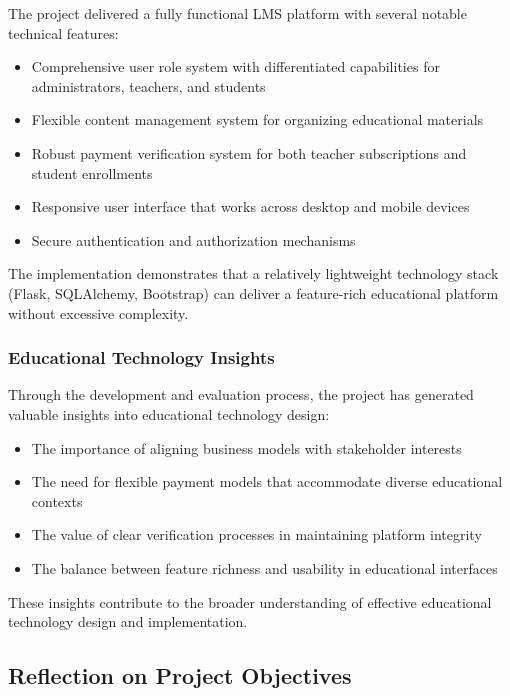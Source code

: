 The project delivered a fully functional LMS platform with several notable technical features:

\begin{itemize}
    \item Comprehensive user role system with differentiated capabilities for administrators, teachers, and students
    \item Flexible content management system for organizing educational materials
    \item Robust payment verification system for both teacher subscriptions and student enrollments
    \item Responsive user interface that works across desktop and mobile devices
    \item Secure authentication and authorization mechanisms
\end{itemize}

The implementation demonstrates that a relatively lightweight technology stack (Flask, SQLAlchemy, Bootstrap) can deliver a feature-rich educational platform without excessive complexity.

\subsubsection{Educational Technology Insights}

Through the development and evaluation process, the project has generated valuable insights into educational technology design:

\begin{itemize}
    \item The importance of aligning business models with stakeholder interests
    \item The need for flexible payment models that accommodate diverse educational contexts
    \item The value of clear verification processes in maintaining platform integrity
    \item The balance between feature richness and usability in educational interfaces
\end{itemize}

These insights contribute to the broader understanding of effective educational technology design and implementation.

\subsection{Reflection on Project Objectives}

